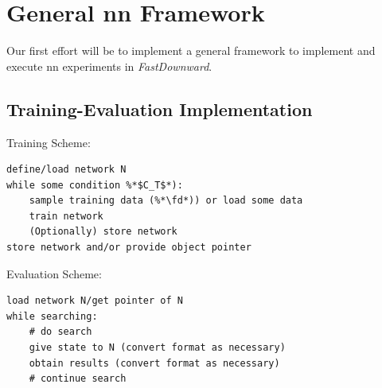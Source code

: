 \documentclass{report}
\begin{document}
\newcommand{\fd}{\textit{FastDownward}}
\newcommand{\py}{\textit{Python}}
\newcommand{\cpp}{\textit{C++}}
\newcommand{\evaluate}{\textit{evaluate}}
\newcommand*{\fullref}[1]{\hyperref[{#1}]{\autoref*{#1} ``\nameref*{#1}''}}

\newenvironment{edit}[1]{\textbf{#1}\begin{addmargin}[0.5cm]{0.5cm}}{\end{addmargin}\ignorespacesafterend\bigskip}


\chapter{General \acrlong{nn} Framework}

Our first effort will be to implement a general framework to implement and
execute \gls{nn} experiments in \fd{}.

\section{Training-Evaluation Implementation}
Training Scheme:

\begin{lstlisting}[caption=Training Phase]
define/load network N
while some condition %*$C_T$*):
	sample training data (%*\fd*)) or load some data
	train network
	(Optionally) store network
store network and/or provide object pointer
\end{lstlisting}

\noindent{}Evaluation Scheme:
\begin{lstlisting}[caption=Evaluation Phase]
load network N/get pointer of N
while searching:
	# do search
	give state to N (convert format as necessary)
	obtain results (convert format as necessary)
	# continue search
\end{lstlisting}
\end{document}
